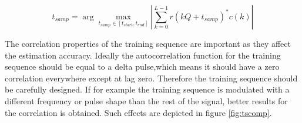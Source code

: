 \documentclass[12pt,a4paper,openright]{report}
\begin{document}
\begin{equation}
{t_{samp}} = \arg \mathop {\max }\limits_{{t_{samp}} \in [{t_{start}},{t_{end}}]} \left| {\sum\limits_{k = 0}^{L - 1} {r(kQ + {t_{samp}})^*c(k)} } \right|
\end{equation}

The correlation properties of the training sequence are important as they affect the estimation accuracy. Ideally the autocorrelation function for the training sequence should be equal to a delta pulse,which means it should have a zero correlation everywhere except at lag zero. Therefore the training sequence should be carefully designed. If for example the training sequence is modulated with a different frequency or pulse shape than the rest of the signal, better results for the correlation is obtained. Such effects are depicted in figure \ref{fig:tscomp}. 
\end{document}
